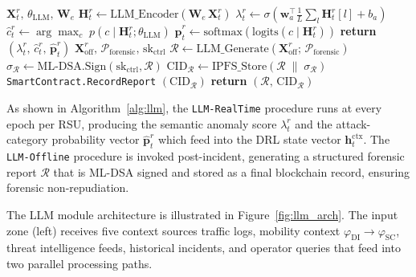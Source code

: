 \begin{algorithm}[H]
\caption{LLM Contextual Intelligence (\texttt{LLM-Intel})}
\label{alg:llm}
\begin{algorithmic}[1]
\small
{}
  {$\mathbf{X}_t^r,\,\theta_{\mathrm{LLM}},\,\mathbf{W}_e$}
  \State $\mathbf{H}_t^r \gets
    \mathrm{LLM\_Encoder}(\mathbf{W}_e\,\mathbf{X}_t^r)$
  \State $\lambda_t^r \gets
    \sigma(\mathbf{w}_a^\top
    \tfrac{1}{L}\sum_l \mathbf{H}_t^r[l] + b_a)$
  \State $\hat{c}_t^r \gets
    \arg\max_c\;p(c\mid\mathbf{H}_t^r;\theta_{\mathrm{LLM}})$
  \State $\hat{\mathbf{p}}_t^r \gets
    \mathrm{softmax}(\mathrm{logits}
    (c\mid\mathbf{H}_t^r))$
  \State \textbf{return}
    $(\lambda_t^r,\,\hat{c}_t^r,\,\hat{\mathbf{p}}_t^r)$
\EndProcedure
\vspace{0.4em}
  {$\mathbf{X}_{\mathrm{off}}^r,\,
  \mathcal{P}_{\mathrm{forensic}},\,
  \mathrm{sk}_{\mathrm{ctrl}}$}
  \State $\mathcal{R} \gets
    \mathrm{LLM\_Generate}(
    \mathbf{X}_{\mathrm{off}}^r;\,
    \mathcal{P}_{\mathrm{forensic}})$
  \State $\sigma_\mathcal{R} \gets
    \mathrm{ML\text{-}DSA.Sign}
    (\mathrm{sk}_{\mathrm{ctrl}},\mathcal{R})$
  \State $\mathrm{CID}_\mathcal{R} \gets
    \mathrm{IPFS\_Store}
    (\mathcal{R}\;\|\;\sigma_\mathcal{R})$
  \State \texttt{SmartContract.RecordReport}
    $(\mathrm{CID}_\mathcal{R})$
  \State \textbf{return}
    $(\mathcal{R},\,\mathrm{CID}_\mathcal{R})$
\EndProcedure
\end{algorithmic}
\end{algorithm}

As shown in Algorithm~\ref{alg:llm}, the
\texttt{LLM-RealTime} procedure runs at every epoch per
RSU, producing the semantic anomaly score $\lambda_t^r$
and the attack-category probability vector
$\hat{\mathbf{p}}_t^r$ which feed into the DRL state
vector $\mathbf{h}_t^{\mathrm{ctx}}$. The
\texttt{LLM-Offline} procedure is invoked post-incident,
generating a structured forensic report $\mathcal{R}$
that is ML-DSA signed and stored as a final blockchain
record, ensuring forensic non-repudiation.


The LLM module architecture is illustrated in
Figure~\ref{fig:llm_arch}. The input zone (left) receives
five context sources traffic logs, mobility context
$\varphi_{\mathrm{DI}} \to \varphi_{\mathrm{SC}}$, threat
intelligence feeds, historical incidents, and operator
queries that feed into two parallel processing paths.

